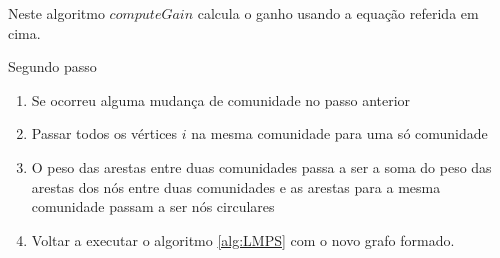 \documentclass[a4paper,10pt]{report}
\begin{document}
Neste algoritmo $computeGain$ calcula o ganho usando a equação referida em cima.

\begin{algorithm}
\caption{Segundo passo}
	\begin{enumerate}
		\item Se ocorreu alguma mudança de comunidade no passo anterior
		\item Passar todos os vértices $i$ na mesma comunidade para uma só comunidade
		\item O peso das arestas entre duas comunidades passa a ser a soma do peso das arestas dos nós entre duas comunidades e as arestas para a mesma comunidade passam a ser nós circulares
		\item Voltar a executar o algoritmo \ref{alg:LMPS} com o novo grafo formado.
	\end{enumerate}
\end{algorithm}
\end{document}
